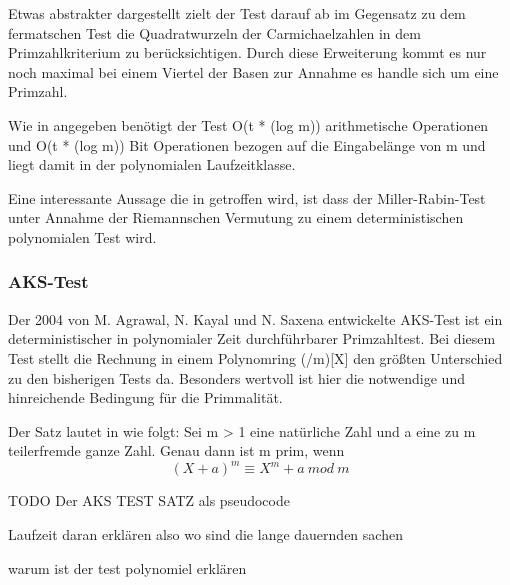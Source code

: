  		Etwas abstrakter dargestellt zielt der Test darauf ab im Gegensatz zu dem fermatschen Test die Quadratwurzeln der Carmichaelzahlen in dem Primzahlkriterium zu berücksichtigen. Durch diese Erweiterung kommt es nur noch maximal bei einem Viertel der Basen zur Annahme es handle sich um eine Primzahl.
 		
 		Wie in \cite{Algebraische:und:zahlentheoretische:Grundlagen:fuer:die:Informatik} angegeben benötigt der Test O(t * (log m)) arithmetische Operationen und   O(t * (log m)) Bit Operationen bezogen auf die Eingabelänge von m und liegt damit in der polynomialen Laufzeitklasse.
 		
 		Eine interessante Aussage die in \cite{Algorithmische:Zahlentheorie} getroffen wird, ist dass der Miller-Rabin-Test unter Annahme der Riemannschen Vermutung zu einem deterministischen polynomialen Test wird.
 		
		 
			
		\subsubsection{AKS-Test}
		Der 2004 von M. Agrawal, N. Kayal und N. Saxena entwickelte AKS-Test ist ein deterministischer in polynomialer Zeit durchführbarer Primzahltest. Bei diesem Test stellt die Rechnung in einem Polynomring (/m)[X] den größten Unterschied zu den bisherigen Tests da. Besonders wertvoll ist hier die notwendige und hinreichende Bedingung für die Primmalität.
		
		Der Satz lautet in \cite{Algorithmische:Zahlentheorie} wie folgt:
		Sei m > 1 eine natürliche Zahl und a eine zu m teilerfremde ganze
		Zahl. Genau dann ist m prim, wenn
		\begin{displaymath}
			(X + a)^m \equiv X^m + a~mod~m
		\end{displaymath}
		
		TODO Der AKS TEST SATZ als pseudocode 
		
		Laufzeit daran erklären also wo sind die lange dauernden sachen
		
		warum ist der test polynomiel erklären
		
		
		
		
		
		
		
		
		
		
		
		
		
		
		
		
		
		
		
		
		
		
		